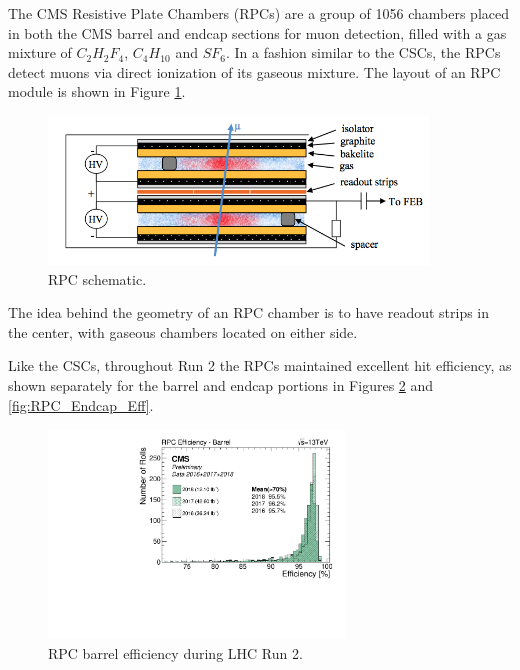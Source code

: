 
The CMS Resistive Plate Chambers (RPCs) are a group of 1056 chambers placed in both the CMS barrel and endcap sections for muon detection, filled with a gas mixture of $C_{2}H_{2}F_{4}$, $C_{4}H_{10}$ and $SF_{6}$. In a fashion similar to the CSCs, the RPCs detect muons via direct ionization of its gaseous mixture. The layout of an RPC module is shown in Figure \ref{fig:RPC_Schema}. 

\begin{figure}[H]
    \centering
    \includegraphics[width=0.9\textwidth]{Images/CMS/Muons/RPC/RPC_Schema.png}
    \caption{RPC schematic.}
    \label{fig:RPC_Schema}
\end{figure}

The idea behind the geometry of an RPC chamber is to have readout strips in the center, with gaseous chambers located on either side. 

Like the CSCs, throughout Run 2 the RPCs maintained excellent hit efficiency, as shown separately for the barrel and endcap portions in Figures \ref{fig:RPC_Barrel_Eff} and \ref{fig:RPC_Endcap_Eff}. 

\begin{figure}[H]
    \centering
    \includegraphics[width=0.7\textwidth]{Images/CMS/Muons/RPC/RPC_EffCmpBarrel.pdf}
    \caption{RPC barrel efficiency during LHC Run 2.}
    \label{fig:RPC_Barrel_Eff}
\end{figure}

